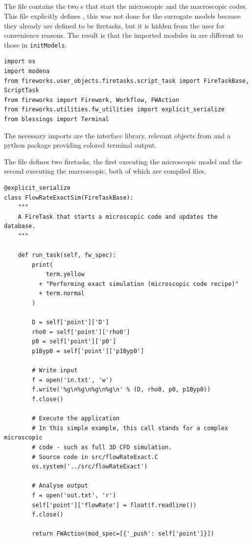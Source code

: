 \subsection{\twoTank}
%
The {\twoTank} file contains the two {\FireTask}s that start the microscopic and the macroscopic codes.
This file explicitly defines {\FireTask}, this was not done for the surrogate models because they already are defined to be firetasks, but it is hidden from the user for convenience reasons. 
The result is that the imported modules in {\twoTank} are different to those in \texttt{initModels}. 
%
\begin{lstlisting}[style=lstPython, firstnumber=39]
import os
import modena
from fireworks.user_objects.firetasks.script_task import FireTaskBase, ScriptTask
from fireworks import Firework, Workflow, FWAction
from fireworks.utilities.fw_utilities import explicit_serialize
from blessings import Terminal
\end{lstlisting}
%
The necessary imports are the {\MoDeNa} interface library, relevant objects from {\FireWorks} and a python package providing colored terminal output.
%
\par
%
The file defines two firetasks, the first executing the microscopic model and the second executing the macroscopic, both of which are compiled {\Clang} files.
%
\begin{lstlisting}[style=lstPython, firstnumber=59]
@explicit_serialize
class FlowRateExactSim(FireTaskBase):
    """
    A FireTask that starts a microscopic code and updates the database.
    """

    def run_task(self, fw_spec):
        print(
            term.yellow
          + "Performing exact simulation (microscopic code recipe)"
          + term.normal
        )

        D = self['point']['D']
        rho0 = self['point']['rho0']
        p0 = self['point']['p0']
        p1Byp0 = self['point']['p1Byp0']

        # Write input
        f = open('in.txt', 'w')
        f.write('%g\n%g\n%g\n%g\n' % (D, rho0, p0, p1Byp0))
        f.close()

        # Execute the application
        # In this simple example, this call stands for a complex microscopic
        # code - such as full 3D CFD simulation.
        # Source code in src/flowRateExact.C
        os.system('../src/flowRateExact')

        # Analyse output
        f = open('out.txt', 'r')
        self['point']['flowRate'] = float(f.readline())
        f.close()

        return FWAction(mod_spec=[{'_push': self['point']}])
\end{lstlisting}
